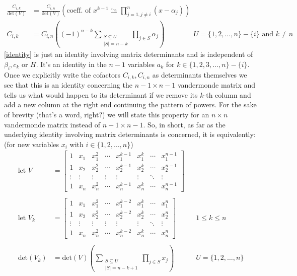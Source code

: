 \documentclass{article}
\begin{document}
\begin{align}
    \frac{C_{i,k}}{\textrm{det}(V)} &= \frac{C_{i,n}}{\textrm{det}(V)}\left(\textrm{coeff. of $x^{k-1}$ in } \prod_{j=1, j\neq i}^{n} (x-\alpha_j)\right) \\
    C_{i,k} &= C_{i,n}\left( (-1)^{n-k} \sum_{\substack{S \subseteq U \\ |S| = n-k}}\prod_{j\in S} \alpha_j\right) && U = \{1,2,\dots,n\} - \{i\} \textrm{ and } k\neq n \label{identity}
\end{align}
\eqref{identity} is just an identity involving matrix determinants and is independent of $\beta_i, c_k$ or $H$. It's an identity in the $n-1$ variables $a_k$ for $k\in\{1,2,3,\dots,n\}-\{i\}$. Once we explicitly write the cofactors $C_{i,k}, C_{i,n}$ as determinants themselves we see that this is an identity concerning the $n-1 \times n-1$ vandermonde matrix and tells us what would happen to its determinant if we remove its $k$-th column and add a new column at the right end continuing the pattern of powers. For the sake of brevity (that's a word, right?) we will state this property for an $n\times n$ vandermonde matrix instead of $n-1 \times n-1$. So, in short, as far as the underlying identity involving matrix determinants is concerned, it is equivalently: (for new variables $x_i$ with $i\in\{1,2,\dots,n\}$)
\begin{align*}
    \textrm{let } V &= \begin{bmatrix}
        1 & x_1 & x_1^2 & \cdots & x_1^{k-1} & x_1^{k} & \cdots & x_1^{n-1} \\
        1 & x_2 & x_2^2 & \cdots & x_2^{k-1} & x_2^{k} & \cdots & x_2^{n-1} \\
        \vdots & \vdots & \vdots & \vdots & \vdots & \vdots & \ddots & \vdots \\
        1 & x_{n} & x_{n}^2 & \cdots & x_{n}^{k-1} & x_{n}^{k} & \cdots & x_{n}^{n-1}
    \end{bmatrix}\\\\
    \textrm{let } V_k &= \begin{bmatrix}
        1 & x_1 & x_1^2 & \cdots & x_1^{k-2} & x_1^{k} & \cdots & x_1^{n} \\
        1 & x_2 & x_2^2 & \cdots & x_2^{k-2} & x_2^{k} & \cdots & x_2^{n} \\
        \vdots & \vdots & \vdots & \vdots & \vdots & \vdots & \ddots & \vdots \\
        1 & x_{n} & x_{n}^2 & \cdots & x_{n}^{k-2} & x_{n}^{k} & \cdots & x_{n}^{n}
    \end{bmatrix} && 1\leq k\leq n\\\\
    \textrm{det}(V_k) &= \textrm{det}(V)\left(
    \sum_{\substack{S \subseteq U \\ |S| = n-k+1}}\prod_{j\in S} x_j
    \right) && U = \{1,2,\dots,n\}
\end{align*}
\end{document}
